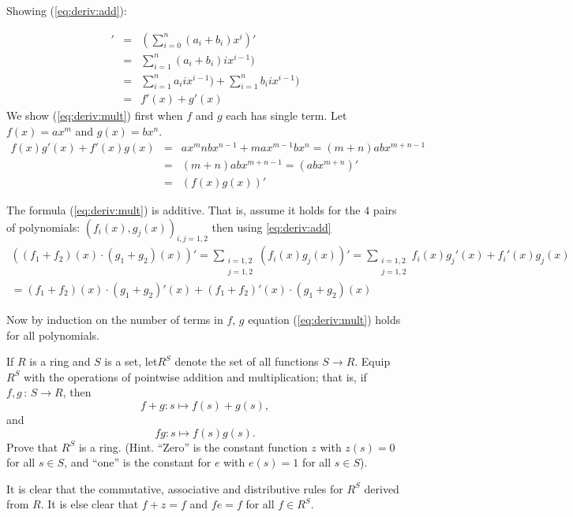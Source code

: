\begin{myenumerate}
Showing (\ref{eq:deriv:add}):

\begin{eqnarray*}
[f(x)+g(x)]'
  & = & \left(\sum_{i=0}^n (a_i+b_i)x^i\right)' \\
  & = & \sum_{i=1}^n (a_i+b_i)ix^{i-1}) \\
  & = & \sum_{i=1}^n a_i i x^{i-1}) +
        \sum_{i=1}^n b_i i x^{i-1}) \\
  & = & f'(x)+g'(x)
\end{eqnarray*}
We show (\ref{eq:deriv:mult}) first when $f$ and $g$ each has single term.
Let \(f(x)=ax^m\) and \(g(x)=bx^n\).
\begin{eqnarray*}
f(x)g'(x) + f'(x)g(x)
 & = & ax^m nbx^{n-1} + max^{m-1}bx^n = (m+n)abx^{m+n-1} \\
 & = & (m+n)abx^{m+n-1} = (abx^{m+n})' \\
 & = & \left(f(x)g(x)\right)'
\end{eqnarray*}

The formula (\ref{eq:deriv:mult}) is additive.
That is, assume it holds for the $4$ pairs of polynomials:
\((f_i(x), g_j(x))_{i,j=1,2}\) then using \ref{eq:deriv:add}
\begin{multline*}
 \left((f_1+f_2)(x)\cdot(g_1+g_2)(x)\right)' =
   \sum_{\substack{i=1,2\\j=1,2}} \left(f_i(x)g_j(x)\right)'
      =   \sum_{\substack{i=1,2\\j=1,2}} f_i(x){g_j}'(x) + {f_i}'(x)g_j(x) \\
   = (f_1+f_2)(x)\cdot(g_1+g_2)'(x) + (f_1+f_2)'(x)\cdot(g_1+g_2)(x)
\end{multline*}

Now by induction on the number of terms in $f$, $g$
equation (\ref{eq:deriv:mult}) holds for all polynomials.


\item
\begin{excopy}
If $R$ is a ring and $S$ is a set, let\(R^S\) denote the set of all
functions \(S\rightarrow R\).
Equip \(R^S\) with the operations of pointwise addition and multiplication;
that is, if \(f,g\,:\,S\rightarrow R\), then
\[f+g:s \mapsto f(s) + g(s),\]
and
\[fg:s \mapsto f(s)g(s).\]
Prove that \(R^S\) is a ring. (Hint. ``Zero'' is the constant function $z$
with \(z(s)=0\) for all \(s\in S\),  and ``one'' is the constant for
$e$ with \(e(s)=1\) for all \(s\in S\)).
\end{excopy}

It is clear that the commutative, associative and distributive rules
for \(R^S\) derived from $R$.
It is else clear that \(f+z=f\) and  \(fe=f\)
for all \(f\in R^S\).

\end{myenumerate}

